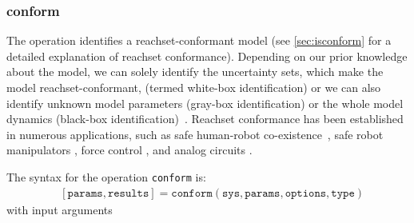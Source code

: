 \subsubsection{conform} \label{sec:conform}

The operation  identifies a reachset-conformant model (see \cref{sec:isconform} for a detailed explanation of reachset conformance). Depending on our prior knowledge about the model, we can solely identify the uncertainty sets, which make the model reachset-conformant, (termed white-box identification) or we can also identify unknown model parameters (gray-box identification) or the whole model dynamics (black-box identification)~\cite{Luetzow2024a,Luetzow2024b}.
Reachset conformance has been established in numerous applications, such as safe human-robot co-existence~\cite{Liu2017a}, safe robot manipulators \cite{Liu2018a}, force control \cite{Liu2021c}, and analog circuits \cite{Kochdumper2020b}.

The syntax for the operation \texttt{conform} is:
\begin{equation*}
\begin{split}
    & [\texttt{params}, \texttt{results}] = \texttt{conform}(\texttt{sys},\texttt{params},\texttt{options},\texttt{type})
\end{split}
\end{equation*}
with input arguments

